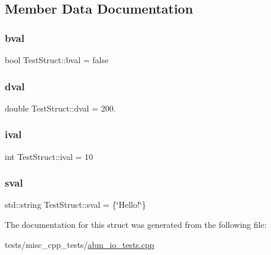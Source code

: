 \subsection{Member Data Documentation}
\mbox{\label{structTestStruct_a8046d4d71123786bfc45df4c0d666ac0}} 
\subsubsection{\texorpdfstring{bval}{bval}}
{\footnotesize\ttfamily bool Test\+Struct\+::bval = false}

\mbox{\label{structTestStruct_ab11940f6d564fb45b0baab4fe4c82493}} 
\subsubsection{\texorpdfstring{dval}{dval}}
{\footnotesize\ttfamily double Test\+Struct\+::dval = 200.}

\mbox{\label{structTestStruct_a6ad834e72192d4caf38c772026422f26}} 
\subsubsection{\texorpdfstring{ival}{ival}}
{\footnotesize\ttfamily int Test\+Struct\+::ival = 10}

\mbox{\label{structTestStruct_abaea5499c492a99472f0a2fd50b95cb7}} 
\subsubsection{\texorpdfstring{sval}{sval}}
{\footnotesize\ttfamily std\+::string Test\+Struct\+::sval = \{\char`\"{}Hello!\char`\"{}\}}



The documentation for this struct was generated from the following file\+:\begin{DoxyCompactItemize}
\item 
tests/misc\+\_\+cpp\+\_\+tests/\hyperlink{abm__io__tests_8cpp}{abm\+\_\+io\+\_\+tests.\+cpp}\end{DoxyCompactItemize}

